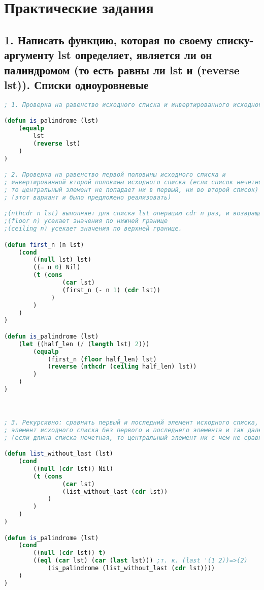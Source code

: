 \documentclass[12pt]{report}
\begin{document}
	\thispagestyle{empty}


	




\chapter*{Практические задания}	

\section*{1. Написать функцию, которая по своему списку-аргументу lst определяет, является ли он палиндромом (то есть равны ли lst и (reverse lst)). Списки одноуровневые}


\begin{lstlisting}[language=Lisp]	
; 1. Проверка на равенство исходного списка и инвертированного исходного списка.

(defun is_palindrome (lst) 
	(equalp 
		lst 
		(reverse lst)
	)
)

; 2. Проверка на равенство первой половины исходного списка и 
; инвертированной второй половины исходного списка (если список нечетной длины, 
; то центральный элемент не попадает ни в первый, ни во второй список)
; (этот вариант и было предложено реализовать)

;(nthcdr n lst) выполняет для списка lst операцию cdr n раз, и возвращает результат
;(floor n) усекает значения по нижней границе
;(ceiling n) усекает значения по верхней границе.

(defun first_n (n lst) 
	(cond 
		((null lst) lst)
		((= n 0) Nil)
		(t (cons 
				(car lst) 
				(first_n (- n 1) (cdr lst))
			 )
		)
	)
)

(defun is_palindrome (lst)
	(let ((half_len (/ (length lst) 2)))
		(equalp 
			(first_n (floor half_len) lst) 
			(reverse (nthcdr (ceiling half_len) lst))
		)
	)
)



; 3. Рекурсивно: сравнить первый и последний элемент исходного списка, первый и последний 
; элемент исходного списка без первого и последнего элемента и так далее.
; (если длина списка нечетная, то центральный элемент ни с чем не сравнивается)

(defun list_without_last (lst)
	(cond
		((null (cdr lst)) Nil)
		(t (cons 
				(car lst) 
				(list_without_last (cdr lst))
			)
		)
	)
)

(defun is_palindrome (lst)
	(cond 
		((null (cdr lst)) t)
		((eql (car lst) (car (last lst))) ;т. к. (last '(1 2))=>(2)
			(is_palindrome (list_without_last (cdr lst))))
	)
)
\end{lstlisting}
\end{document}
